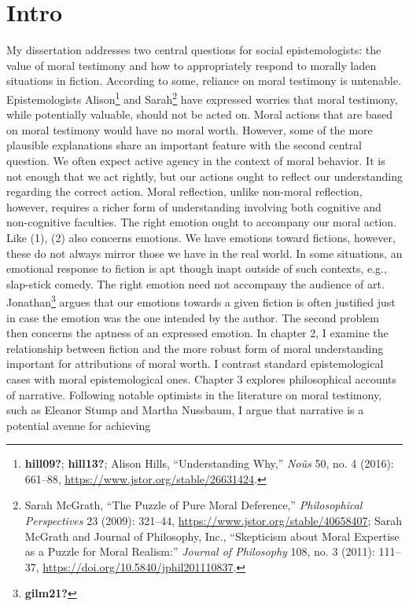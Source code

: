 \documentclass[phdthesis,12pt,final]{wuthesis}
\theoremstyle{definition}
\theoremstyle{definition}
\theoremstyle{definition}
\theoremstyle{definition}
\theoremstyle{remark}
\begin{document}
\cleardoublepage
\begin{singlespace}
\setcounter{page}{2}
\renewcommand*\contentsname{Table of Contents}
\tableofcontents
\end{singlespace}




\cleardoublepage
{}
\setcounter{page}{1}

\chapter{Intro}\label{intro}

My dissertation addresses two central questions for social epistemologists: the value of moral testimony and how to appropriately respond to morally laden situations in fiction. According to some, reliance on moral testimony is untenable. Epistemologists Alison\footnote{\textbf{hill09?}; \textbf{hill13?}; Alison Hills, {``Understanding {Why},''} \emph{Noûs} 50, no. 4 (2016): 661--88, \url{https://www.jstor.org/stable/26631424}.} and Sarah\footnote{Sarah McGrath, {``The {Puzzle} of {Pure Moral Deference},''} \emph{Philosophical Perspectives} 23 (2009): 321--44, \url{https://www.jstor.org/stable/40658407}; Sarah McGrath and Journal of Philosophy, Inc., {``Skepticism about {Moral Expertise} as a {Puzzle} for {Moral Realism}:''} \emph{Journal of Philosophy} 108, no. 3 (2011): 111--37, \url{https://doi.org/10.5840/jphil201110837}.} have expressed worries that moral testimony, while potentially valuable, should not be acted on. Moral actions that are based on moral testimony would have no moral worth. However, some of the more plausible explanations share an important feature with the second central question. We often expect active agency in the context of moral behavior. It is not enough that we act rightly, but our actions ought to reflect our understanding regarding the correct action. Moral reflection, unlike non-moral reflection, however, requires a richer form of understanding involving both cognitive and non-cognitive faculties. The right emotion ought to accompany our moral action. Like (1), (2) also concerns emotions. We have emotions toward fictions, however, these do not always mirror those we have in the real world. In some situations, an emotional response to fiction is apt though inapt outside of such contexts, e.g., slap-stick comedy. The right emotion need not accompany the audience of art. Jonathan\footnote{\textbf{gilm21?}} argues that our emotions towards a given fiction is often justified just in case the emotion was the one intended by the author. The second problem then concerns the aptness of an expressed emotion. In chapter 2, I examine the relationship between fiction and the more robust form of moral understanding important for attributions of moral worth. I contrast standard epistemological cases with moral epistemological ones. Chapter 3 explores philosophical accounts of narrative. Following notable optimists in the literature on moral testimony, such as Eleanor Stump and Martha Nussbaum, I argue that narrative is a potential avenue for achieving 
\end{document}
